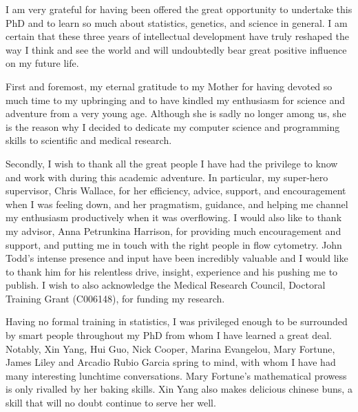 
\begin{acknowledgements}      


 I am very grateful for having been offered the great opportunity to undertake this PhD and to learn so much about statistics, genetics, and science in general.
 I am certain that these three years of intellectual development have truly reshaped the way I think and see the world and will undoubtedly bear great positive influence on my future life.

 First and foremost, my eternal gratitude to my Mother for having devoted so much time to my upbringing and to have kindled my enthusiasm for science and adventure from a very young age.
 Although she is sadly no longer among us, she is the reason why I decided to dedicate my computer science and programming skills to scientific and medical research.

 Secondly, I wish to thank all the great people I have had the privilege to know and work with during this academic adventure.
 In particular, my super-hero supervisor, Chris Wallace, for her efficiency, advice, support, and encouragement when I was feeling down, and her pragmatism, guidance, and helping me channel my enthusiasm productively when it was overflowing.
 I would also like to thank my advisor, Anna Petrunkina Harrison, for providing much encouragement and support, and putting me in touch with the right people in flow cytometry.
 John Todd's intense presence and input have been incredibly valuable and I would like to thank him for his relentless drive, insight, experience and his pushing me to publish.
 I wish to also acknowledge the Medical Research Council, Doctoral Training Grant (C006148), for funding my research.

 Having no formal training in statistics, I was privileged enough to be surrounded by smart people throughout my PhD from whom I have learned a great deal.
 Notably, Xin Yang, Hui Guo, Nick Cooper, Marina Evangelou, Mary Fortune, James Liley and Arcadio Rubio Garcia spring to mind, with whom I have had many interesting lunchtime conversations.
 Mary Fortune's  mathematical prowess is only rivalled by her baking skills.
 Xin Yang also makes delicious chinese buns, a skill that will no doubt continue to serve her well.


\end{acknowledgements}
